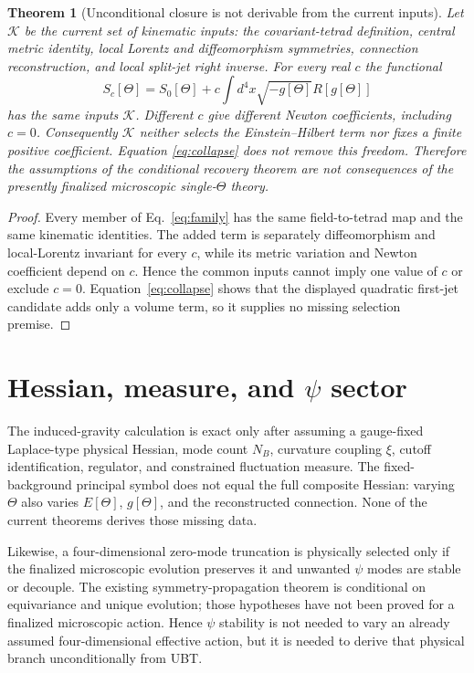 \documentclass[11pt,a4paper]{article}
\newtheorem{theorem}{Theorem}
\begin{document}
\begin{theorem}[Unconditional closure is not derivable from the current inputs]
Let $\mathcal K$ be the current set of kinematic inputs: the covariant-tetrad
definition, central metric identity, local Lorentz and diffeomorphism
symmetries, connection reconstruction, and local split-jet right inverse.
For every real $c$ the functional
\begin{equation}\label{eq:family}
 S_c[\Theta]=S_0[\Theta]+c\int d^4x\sqrt{-g[\Theta]}
 R[g[\Theta]]
\end{equation}
has the same inputs $\mathcal K$.  Different $c$ give different Newton
coefficients, including $c=0$.  Consequently $\mathcal K$ neither selects the
Einstein--Hilbert term nor fixes a finite positive coefficient.  Equation
\eqref{eq:collapse} does not remove this freedom.  Therefore the assumptions
of the conditional recovery theorem are not consequences of the presently
finalized microscopic single-$\Theta$ theory.
\end{theorem}
\begin{proof}
Every member of Eq.~\eqref{eq:family} has the same field-to-tetrad map and the
same kinematic identities.  The added term is separately diffeomorphism and
local-Lorentz invariant for every $c$, while its metric variation and Newton
coefficient depend on $c$.  Hence the common inputs cannot imply one value of
$c$ or exclude $c=0$.  Equation~\eqref{eq:collapse} shows that the displayed
quadratic first-jet candidate adds only a volume term, so it supplies no
missing selection premise.
\end{proof}

\section{Hessian, measure, and $\psi$ sector}
The induced-gravity calculation is exact only after assuming a gauge-fixed
Laplace-type physical Hessian, mode count $N_B$, curvature coupling $\xi$,
cutoff identification, regulator, and constrained fluctuation measure.  The
fixed-background principal symbol does not equal the full composite Hessian:
varying $\Theta$ also varies $E[\Theta]$, $g[\Theta]$, and the reconstructed
connection.  None of the current theorems derives those missing data.

Likewise, a four-dimensional zero-mode truncation is physically selected only
if the finalized microscopic evolution preserves it and unwanted $\psi$ modes
are stable or decouple.  The existing symmetry-propagation theorem is
conditional on equivariance and unique evolution; those hypotheses have not
been proved for a finalized microscopic action.  Hence $\psi$ stability is
not needed to vary an already assumed four-dimensional effective action, but
it is needed to derive that physical branch unconditionally from UBT.
\end{document}
